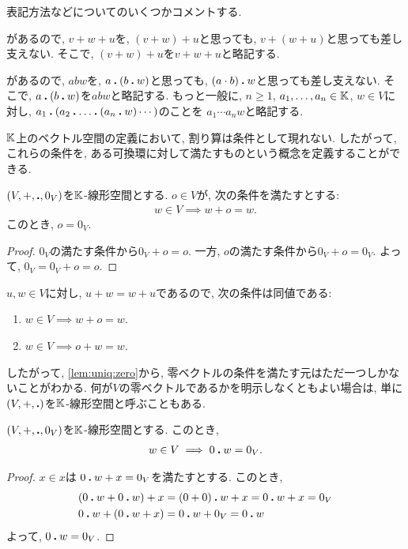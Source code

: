 表記方法などについてのいくつかコメントする.
\begin{remark}
があるので, $v+w+u$を, $(v+w)+u$と思っても,
$v+(w+u)$と思っても差し支えない.
そこで, $(v+w)+u$を$v+w+u$と略記する.
\end{remark}
\begin{remark}
があるので, $abw$を, $a\mathbin{\boldsymbol{.}} (b\mathbin{\boldsymbol{.}} w)$と思っても,
$(a\cdot b)\mathbin{\boldsymbol{.}} w$と思っても差し支えない.
そこで, $a\mathbin{\boldsymbol{.}} (b\mathbin{\boldsymbol{.}} w)$を$abw$と略記する.
もっと一般に, $n\geq 1$, $a_1,\ldots, a_n\in\mathbb{K}$, $w\in V$に対し,
$a_1\mathbin{\boldsymbol{.}} (a_2\mathbin{\boldsymbol{.}} \ldots\mathbin{\boldsymbol{.}} (a_n\mathbin{\boldsymbol{.}} w)\cdots)$のことを
$a_1\cdots a_n w$と略記する.
\end{remark}
\begin{remark}
  $\mathbb{K}$上のベクトル空間の定義において,
  割り算は条件として現れない.
  したがって,
  これらの条件を, ある可換環に対して満たすものという概念を定義することができる.
\end{remark}
\begin{prop}
  \label{lem:uniq:zero}
  $(V,+,\mathbin{\boldsymbol{.}} ,0_V)$を$\mathbb{K}$-線形空間とする.
  $o\in V$が, 次の条件を満たすとする:
  \begin{align*}
    w\in V \implies w+o=w.
  \end{align*}
  このとき, $o=0_V$.
\end{prop}
\begin{proof}
  $0_V$の満たす条件から$0_V+o=o$.
  一方, $o$の満たす条件から$0_V+o=0_V$.
  よって, $0_V=0_V+o=o$.
\end{proof}
\begin{remark}
  $u,w\in V$に対し, $u+w=w+u$であるので,
  次の条件は同値である:
  \begin{enumerate}
  \item $w\in V \implies w+o=w$.
  \item $w\in V \implies o+w=w$.
  \end{enumerate}
  したがって, \cref{lem:uniq:zero}から,
  零ベクトルの条件を満たす元はただ一つしかないことがわかる.
  何が$V$の零ベクトルであるかを明示しなくともよい場合は,
  単に$(V,+,\mathbin{\boldsymbol{.}} )$を$\mathbb{K}$-線形空間と呼ぶこともある.
\end{remark}
\begin{prop}
  \label{prop:zeroveciszeroscalar}
  $(V,+,\mathbin{\boldsymbol{.}} ,0_V)$を$\mathbb{K}$-線形空間とする.
  このとき,
  \begin{align*}
    w\in V \implies 0\mathbin{\boldsymbol{.}} w=0_V. 
  \end{align*}
\end{prop}
\begin{proof}
  $x\in x$は
  $0\mathbin{\boldsymbol{.}} w+x=0_V$を満たすとする.
  このとき,
  \begin{align*}
    (0\mathbin{\boldsymbol{.}} w+0\mathbin{\boldsymbol{.}} w)+x&=(0+0)\mathbin{\boldsymbol{.}} w+x=0\mathbin{\boldsymbol{.}} w+x=0_V\\
    0\mathbin{\boldsymbol{.}} w+(0\mathbin{\boldsymbol{.}} w+x)&=0\mathbin{\boldsymbol{.}} w+0_V=0\mathbin{\boldsymbol{.}} w
  \end{align*}
  よって, $0\mathbin{\boldsymbol{.}} w=0_V$.  
\end{proof}

